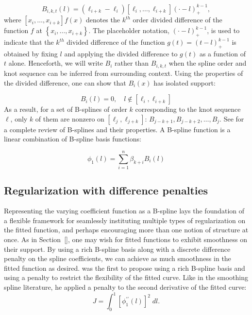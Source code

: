 \documentclass[12pt]{article}
\theoremstyle{definition}
\begin{document}
\begin{equation} \label{eq:bspline_definition}
B_{i,k,t}\left(l\right) = \left(\ell_{i+k}-\ell_i\right)\left[\ell_i,\dots,\ell_{i+k}\right]\left(\cdot -l \right)_+^{k-1},
\end{equation}  
\noindent
where $\left[ x_i,\dots,x_{i+k} \right] f\left(x\right)$ denotes the $k^{th}$ order divided difference of the function $f$ at $\left\{ x_i,\dots,x_{i+k} \right\}$. The placeholder notation, $\left(\cdot - l\right)_+^{k-1}$, is used to indicate that the $k^{th}$ divided difference of the function $g\left(t \right) = \left(t-l\right)^{k-1}_+$ is obtained by fixing $l$ and applying the divided difference to $g\left(t \right)$ as a function of $t$ alone. Henceforth, we will write $B_i$ rather than $B_{i,k,t}$ when the spline order and knot sequence can be inferred from surrounding context. Using the properties of the divided difference, one can show that  $B_i\left(x\right)$ has isolated support:

\[
B_i\left(l\right) = 0, \quad l \not \in \left[\ell_{i},\ell_{i+k}\right]
\]
\noindent
As a result, for a set of B-splines of order $k$ corresponding to the knot sequence $\ell$, only $k$ of them are nonzero on $\left[\ell_{j},\ell_{j+k}\right]$: $B_{j-k+1},B_{j-k+2},\dots,B_{j}$. See \citet{de1978practical} for a complete review of B-splines and their properties. A B-spline function is a linear combination of B-spline basis functions:

\begin{equation} \label{eq:b-spline-representation}
\phi_1\left(l\right) =  \sum_{i=1}^n \beta_{k+i} B_{i}\left(l\right)
\end{equation}
\noindent


\subsection{Regularization with difference penalties} \label{subsection:univariate-psplines}

Representing the varying coefficient function as a B-spline lays the foundation of a flexible framework for seamlessly instituting multiple types of regularization on the fitted function, and perhaps encouraging more than one notion of structure at once. As in Section~\ref{}, one may wish for fitted functions to exhibit smoothness on their support. By using a rich B-spline basis along with a discrete difference penalty on the spline coefficients, we can achieve as much smoothness in the fitted function as desired. \cite{o1986statistical} was the first to propose using a rich B-spline basis and using a penalty to restrict the flexibility of the fitted curve. Like \citet{wahba1990spline} in the smoothing spline literature, he applied a penalty to the second derivative of the fitted curve:
\[
J = \int_0^1 \left[ \phi_1^{\prime \prime}\left(l\right)\right]^2\;dl.
\]
\end{document}
